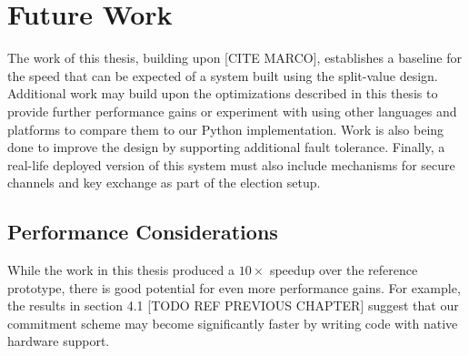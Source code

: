 \chapter{Future Work}

The work of this thesis, building upon [CITE MARCO], establishes a baseline for the speed that can be expected of a system built using the split-value design. Additional work may build upon the optimizations described in this thesis to provide further performance gains or experiment with using other languages and platforms to compare them to our Python implementation. Work is also being done to improve the design by supporting additional fault tolerance. Finally, a real-life deployed version of this system must also include mechanisms for secure channels and key exchange as part of the election setup.

\section{Performance Considerations}

While the work in this thesis produced a $10 \times$ speedup over the reference prototype, there is good potential for even more performance gains. For example, the results in section 4.1 [TODO REF PREVIOUS CHAPTER] suggest that our commitment scheme may become significantly faster by writing code with native hardware support.

